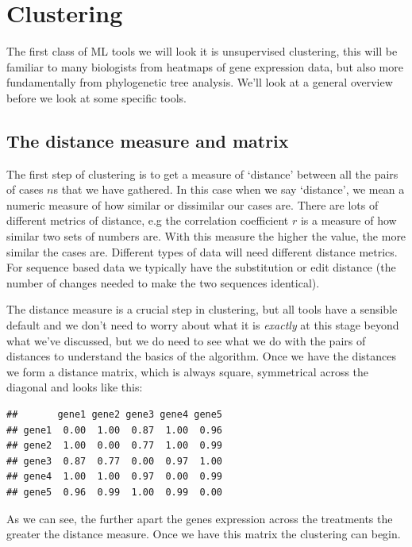 \documentclass[
]{book}
\begin{document}
\hypertarget{clustering}{%
\section{Clustering}\label{clustering}}

The first class of ML tools we will look it is unsupervised clustering, this will be familiar to many biologists from heatmaps of gene expression data, but also more fundamentally from phylogenetic tree analysis. We'll look at a general overview before we look at some specific tools.

\hypertarget{the-distance-measure-and-matrix}{%
\subsection{The distance measure and matrix}\label{the-distance-measure-and-matrix}}

The first step of clustering is to get a measure of `distance' between all the pairs of cases \(n\)s that we have gathered. In this case when we say `distance', we mean a numeric measure of how similar or dissimilar our cases are. There are lots of different metrics of distance, e.g the correlation coefficient \(r\) is a measure of how similar two sets of numbers are. With this measure the higher the value, the more similar the cases are. Different types of data will need different distance metrics. For sequence based data we typically have the substitution or edit distance (the number of changes needed to make the two sequences identical).

The distance measure is a crucial step in clustering, but all tools have a sensible default and we don't need to worry about what it is \emph{exactly} at this stage beyond what we've discussed, but we do need to see what we do with the pairs of distances to understand the basics of the algorithm. Once we have the distances we form a distance matrix, which is always square, symmetrical across the diagonal and looks like this:

\begin{verbatim}
##       gene1 gene2 gene3 gene4 gene5
## gene1  0.00  1.00  0.87  1.00  0.96
## gene2  1.00  0.00  0.77  1.00  0.99
## gene3  0.87  0.77  0.00  0.97  1.00
## gene4  1.00  1.00  0.97  0.00  0.99
## gene5  0.96  0.99  1.00  0.99  0.00
\end{verbatim}

As we can see, the further apart the genes expression across the treatments the greater the distance measure. Once we have this matrix the clustering can begin.
\end{document}
